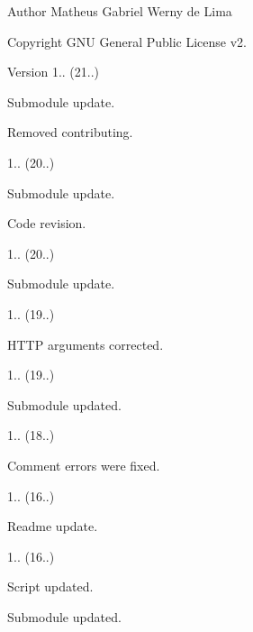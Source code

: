 \begin{DoxyAuthor}{Author}
Matheus Gabriel Werny de Lima 
\end{DoxyAuthor}
\begin{DoxyCopyright}{Copyright}
G\+NU General Public License v2. 
\end{DoxyCopyright}
\begin{DoxyVersion}{Version}
1.. (21..)
\begin{DoxyItemize}
\item Submodule update.
\item Removed contributing. 
\end{DoxyItemize}

1.. (20..)
\begin{DoxyItemize}
\item Submodule update.
\item Code revision. 
\end{DoxyItemize}

1.. (20..)
\begin{DoxyItemize}
\item Submodule update. 
\end{DoxyItemize}

1.. (19..)
\begin{DoxyItemize}
\item H\+T\+TP arguments corrected. 
\end{DoxyItemize}

1.. (19..)
\begin{DoxyItemize}
\item Submodule updated. 
\end{DoxyItemize}

1.. (18..)
\begin{DoxyItemize}
\item Comment errors were fixed. 
\end{DoxyItemize}

1.. (16..)
\begin{DoxyItemize}
\item Readme update. 
\end{DoxyItemize}

1.. (16..)
\begin{DoxyItemize}
\item Script updated.
\item Submodule updated. 
\end{DoxyItemize}


\end{DoxyVersion}
